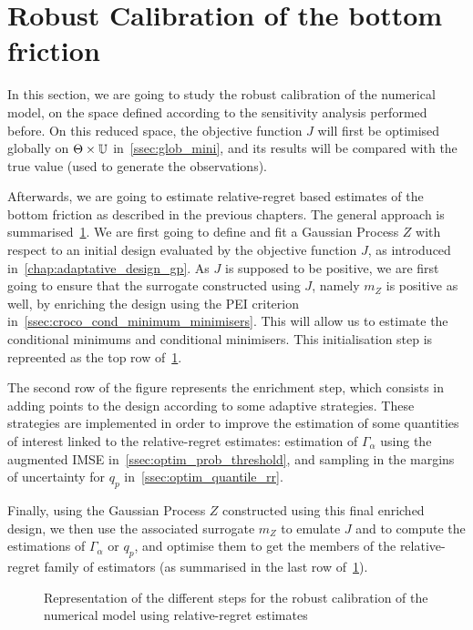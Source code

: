 \documentclass[../../Main_ManuscritThese.tex]{subfiles}
\newcommand\imgpath{/home/victor/acadwriting/Manuscrit/Text/Chapter5/img/}
\begin{document}
\section{Robust Calibration of the bottom friction}
\label{sec:robust_calibration}
In this section, we are going to study the robust calibration of the
numerical model, on the space defined according to the sensitivity
analysis performed before. On this reduced space, the objective
function $J$ will first be optimised globally on
$\Theta \times \mathbb{U}$ in~\cref{ssec:glob_mini}, and its results
will be compared with the true value (used to generate the
observations).

Afterwards, we are going to estimate relative-regret based estimates
of the bottom friction as described in the previous chapters. The
general approach is summarised~\cref{fig:diagram_recap}.  We are first
going to define and fit a Gaussian Process $Z$ with respect to an
initial design evaluated by the objective function $J$,
as introduced in~\cref{chap:adaptative_design_gp}.  As $J$ is supposed to
be positive, we are first going to ensure that the surrogate
constructed using $J$, namely $m_Z$ is positive as well, by enriching
the design using the PEI
criterion in~\cref{ssec:croco_cond_minimum_minimisers}. This will allow
us to estimate the conditional minimums and conditional minimisers.
This initialisation step is repreented as the top row
of~\cref{fig:diagram_recap}.

The second row of the figure represents the enrichment step, which
consists in adding points to the design according to some adaptive
strategies. These strategies are implemented in order to improve the
estimation of some quantities of interest linked to the
relative-regret estimates: estimation of $\Gamma_{\alpha}$ using the
augmented IMSE in~\cref{ssec:optim_prob_threshold}, and sampling in
the margins of uncertainty for $q_p$ in~\cref{ssec:optim_quantile_rr}.

Finally, using the Gaussian Process $Z$ constructed using this final enriched
design, we then use the associated surrogate $m_Z$ to emulate $J$ and
to compute the estimations of $\Gamma_{\alpha}$ or $q_p$, and
optimise them to get the members of the relative-regret family of
estimators (as summarised in the last row of~\cref{fig:diagram_recap}).



\begin{figure}[ht]
  \centering
  
  \caption{\label{fig:diagram_recap} Representation of the different
    steps for the robust calibration of the numerical model using
    relative-regret estimates}
\end{figure}
\end{document}
